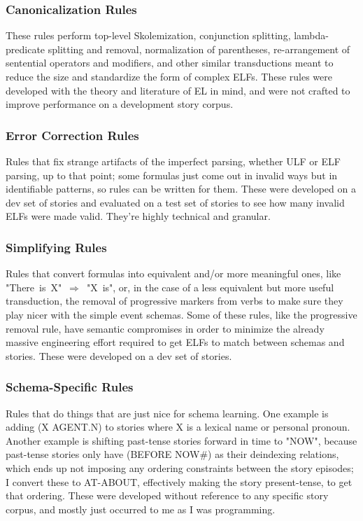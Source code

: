 \subsubsection{Canonicalization Rules}
These rules perform top-level Skolemization, conjunction splitting, lambda-predicate splitting and removal, normalization of parentheses, re-arrangement of sentential operators and modifiers, and other similar transductions meant to reduce the size and standardize the form of complex ELFs. These rules were developed with the theory and literature of EL in mind, and were not crafted to improve performance on a development story corpus.

\subsubsection{Error Correction Rules}
Rules that fix strange artifacts of the imperfect parsing, whether ULF or ELF parsing, up to that point; some formulas just come out in invalid ways but in identifiable patterns, so rules can be written for them. These were developed on a dev set of stories and evaluated on a test set of stories to see how many invalid ELFs were made valid. They're highly technical and granular.

\subsubsection{Simplifying Rules}
Rules that convert formulas into equivalent and/or more meaningful ones, like "There~is~X"~$\Rightarrow$~"X~is", or, in the case of a less equivalent but more useful transduction, the removal of progressive markers from verbs to make sure they play nicer with the simple event schemas. Some of these rules, like the progressive removal rule, have semantic compromises in order to minimize the already massive engineering effort required to get ELFs to match between schemas and stories. These were developed on a dev set of stories.

\subsubsection{Schema-Specific Rules}
Rules that do things that are just nice for schema learning. One example is adding (X AGENT.N) to stories where X is a lexical name or personal pronoun. Another example is shifting past-tense stories forward in time to "NOW", because past-tense stories only have (BEFORE NOW\#) as their deindexing relations, which ends up not imposing any ordering constraints between the story episodes; I convert these to AT-ABOUT, effectively making the story present-tense, to get that ordering. These were developed without reference to any specific story corpus, and mostly just occurred to me as I was programming.

